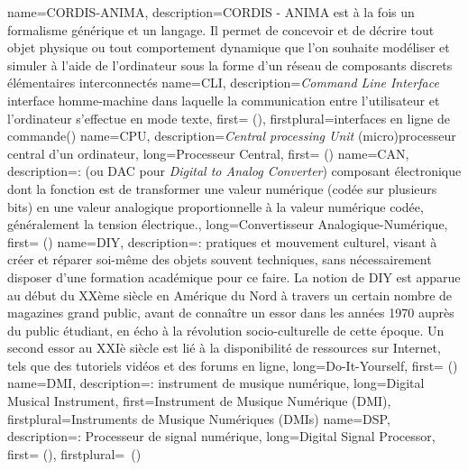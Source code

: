 {
    name={CORDIS-ANIMA},
    description={CORDIS - ANIMA est à la fois un formalisme générique et un langage. Il permet de concevoir et de décrire tout objet physique ou tout comportement dynamique que l'on souhaite modéliser et simuler à l'aide de l'ordinateur sous la forme d'un réseau de composants discrets élémentaires interconnectés}
}
{
    name={CLI},
    description={\textit{Command Line Interface} interface homme-machine dans laquelle la communication entre l'utilisateur et l'ordinateur s'effectue en mode texte},
    first={ ()},
    firstplural={interfaces en ligne de commande(\glspluralsuffix)}
}
{
    name={CPU},
    description={\textit{Central processing Unit} (micro)processeur central d'un ordinateur},
    long={Processeur Central},
    first={ ()}
}
{
    name={CAN},
    description={\textit{}: (ou DAC pour \textit{Digital to Analog Converter}) composant électronique dont la fonction est de transformer une valeur numérique (codée sur plusieurs bits) en une valeur analogique proportionnelle à la valeur numérique codée, généralement la tension électrique.},
    long={Convertisseur Analogique-Numérique},
    first={ ()}
}
{
    name={DIY},
    description={\textit{}: pratiques et mouvement culturel, visant à créer et réparer soi-même des objets souvent techniques, sans nécessairement disposer d'une formation académique pour ce faire. La notion de DIY est apparue au début du XXème siècle en Amérique du Nord à travers un certain nombre de magazines grand public, avant de connaître un essor dans les années 1970 auprès du public étudiant, en écho à la révolution socio-culturelle de cette époque. Un second essor au XXIè siècle est lié à la disponibilité de ressources sur Internet, tels que des tutoriels vidéos et des forums en ligne},
    long={Do-It-Yourself},
    first={ ()}
}
{
    name={DMI},
    description={\textit{}: instrument de musique numérique},
    long={Digital Musical Instrument},
    first={Instrument de Musique Numérique (DMI)},
    firstplural={Instruments de Musique Numériques (DMIs)}
}
{
    name={DSP},
    description={\textit{}: Processeur de signal numérique},
    long={Digital Signal Processor},
    first={ ()},
    firstplural={\glspluralsuffix\ (\glspluralsuffix)}
}
